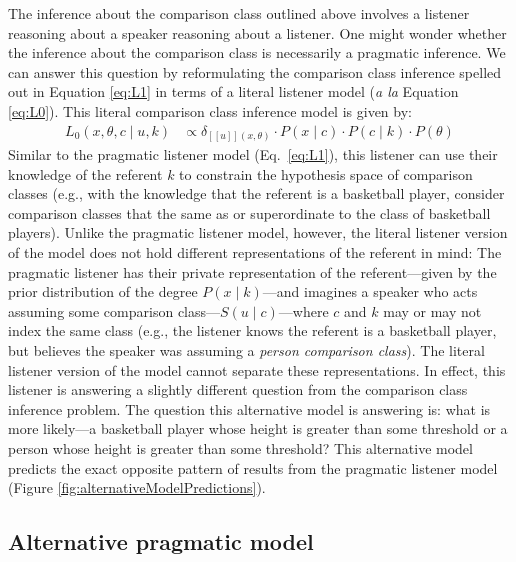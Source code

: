 \documentclass[doc]{apa6}
\begin{document}
The inference about the comparison class outlined above involves a listener reasoning about a speaker reasoning about a listener.
One might wonder whether the inference about the comparison class is necessarily a pragmatic inference.
We can answer this question by reformulating the comparison class inference  spelled out in Equation \ref{eq:L1} in terms of a literal listener model (\emph{a la} Equation \ref{eq:L0}). 
This literal comparison class inference model is given by:
%
  \begin{align}
L_{0}(x, \theta, c \mid u, k) &\propto \delta_{[\![u]\!](x, \theta)} \cdot P(x \mid c) \cdot P(c \mid k) \cdot P(\theta) \label{eq:L0alt}
\end{align}
%
Similar to the pragmatic listener model (Eq.~\ref{eq:L1}), this listener can use their knowledge of the referent $k$ to constrain the hypothesis space of comparison classes (e.g., with the knowledge that the referent is a basketball player, consider comparison classes that the same as or superordinate to the class of basketball players).
Unlike the pragmatic listener model, however, the literal listener version of the model does not hold different representations of the referent in mind: The pragmatic listener has their private representation of the referent---given by the prior distribution of the degree $P(x \mid k)$---and imagines a speaker who acts assuming some comparison class---$S(u \mid c)$---where $c$ and $k$ may or may not index the same class (e.g., the listener knows the referent is a basketball player, but believes the speaker was assuming a \emph{person comparison class}).
The literal listener version of the model cannot separate these representations.
In effect, this listener is answering a slightly different question from the comparison class inference problem. The question this alternative model is answering is: what is more likely---a basketball player whose height is greater than some threshold or a person whose height is greater than some threshold? 
This alternative model predicts the exact opposite pattern of results from the pragmatic listener model (Figure \ref{fig:alternativeModelPredictions}). 

\subsection{Alternative pragmatic model}
\end{document}
